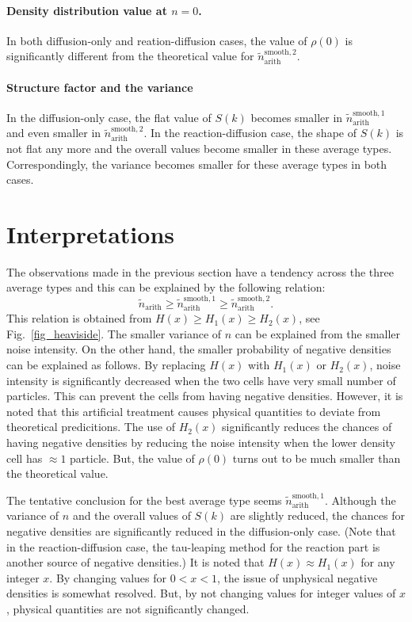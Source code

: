 \documentclass{article}
\begin{document}
\paragraph{\textbf{Density distribution value at $n=0$.}}
In both diffusion-only and reation-diffusion cases, the value of $\rho(0)$ is significantly different from the theoretical value for $\tilde{n}_\mathrm{arith}^{\mathrm{smooth},2}$.

\paragraph{\textbf{Structure factor and the variance}}
In the diffusion-only case, the flat value of $S(k)$ becomes smaller in $\tilde{n}_\mathrm{arith}^{\mathrm{smooth},1}$ and even smaller in $\tilde{n}_\mathrm{arith}^{\mathrm{smooth},2}$.
In the reaction-diffusion case, the shape of $S(k)$ is not flat any more and the overall values become smaller in these average types.
Correspondingly, the variance becomes smaller for these average types in both cases.

\section{Interpretations}

The observations made in the previous section have a tendency across the three average types and this can be explained by the following relation:
\begin{equation}
\tilde{n}_\mathrm{arith} \ge \tilde{n}_\mathrm{arith}^{\mathrm{smooth},1} \ge \tilde{n}_\mathrm{arith}^{\mathrm{smooth},2}.
\end{equation}
This relation is obtained from $H(x)\ge H_1(x)\ge H_2(x)$, see Fig.~\ref{fig_heaviside}.
The smaller variance of $n$ can be explained from the smaller noise intensity.
On the other hand, the smaller probability of negative densities can be explained as follows.
By replacing $H(x)$ with $H_1(x)$ or $H_2(x)$, noise intensity is significantly decreased when the two cells have very small number of particles.
This can prevent the cells from having negative densities.
However, it is noted that this artificial treatment causes physical quantities to deviate from theoretical predicitions.
The use of $H_2(x)$ significantly reduces the chances of having negative densities by reducing the noise intensity when the lower density cell has $\approx 1$ particle.
But, the value of $\rho(0)$ turns out to be much smaller than the theoretical value. 
 
The tentative conclusion for the best average type seems $\tilde{n}_\mathrm{arith}^{\mathrm{smooth},1}$.
Although the variance of $n$ and the overall values of $S(k)$ are slightly reduced, the chances for negative densities are significantly reduced in the diffusion-only case.
(Note that in the reaction-diffusion case, the tau-leaping method for the reaction part is another source of negative densities.)
It is noted that $H(x)\approx H_1(x)$ for any integer $x$.
By changing values for $0<x<1$, the issue of unphysical negative densities is somewhat resolved.
But, by not changing values for integer values of $x$, physical quantities are not significantly changed.
\end{document}
